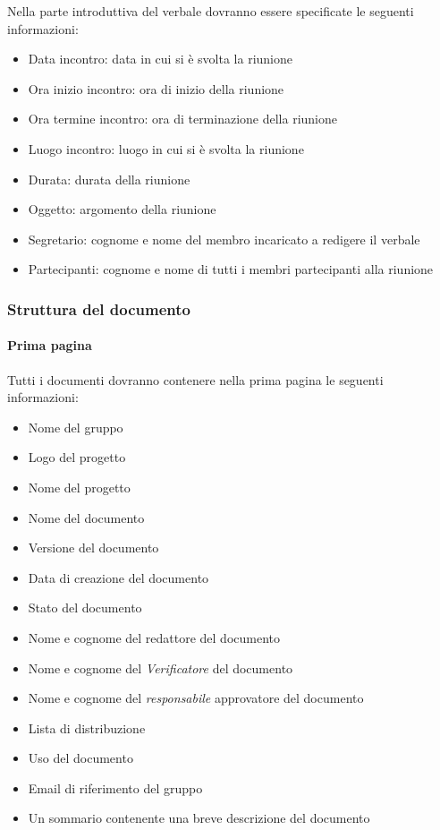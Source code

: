 Nella parte introduttiva del verbale dovranno essere specificate le
seguenti informazioni:
\begin{itemize}
\item Data incontro:  data in cui si è svolta la riunione
\item Ora inizio incontro: ora di inizio della riunione
\item Ora termine incontro: ora di terminazione della riunione
\item Luogo incontro: luogo in cui si è svolta la riunione
\item Durata: durata della riunione
\item Oggetto: argomento della riunione
\item Segretario: cognome e nome del membro incaricato a redigere il verbale
\item Partecipanti: cognome e nome di tutti i membri partecipanti alla
  riunione
\end{itemize}

\subsubsection{Struttura del documento}

\paragraph{Prima pagina }

Tutti i documenti dovranno contenere nella prima pagina le seguenti informazioni:
\begin{itemize}
\item Nome del gruppo
\item Logo del progetto
\item Nome del progetto
\item Nome del documento
\item Versione del documento
\item Data di creazione del documento
\item Stato del documento
\item Nome e cognome del redattore del documento
\item Nome e cognome del  \emph{Verificatore}  del documento
\item Nome e cognome del  \emph{responsabile}  approvatore del documento
\item Lista di distribuzione
\item Uso del documento
\item Email di riferimento del gruppo
\item Un sommario contenente una breve descrizione del documento
\end{itemize}


